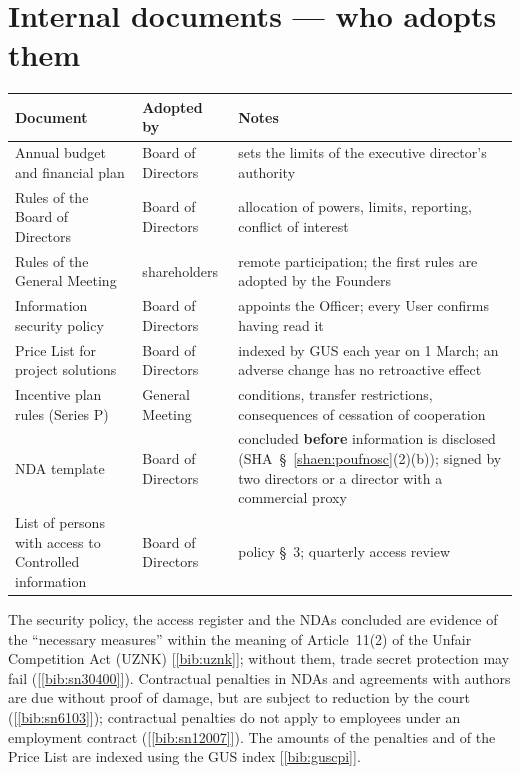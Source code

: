 \documentclass[11pt,a4paper]{report}
\newcommand{\Zr}[1]{[\ref{bib:#1}]}
\begin{document}
\section{Internal documents --- who adopts them}

\begin{tabularx}{\linewidth}{@{}>{\raggedright\arraybackslash}p{4.0cm} >{\raggedright\arraybackslash}p{3.3cm} X@{}}
\toprule
\textbf{Document} & \textbf{Adopted by} & \textbf{Notes} \\
\midrule
Annual budget and financial plan & Board of Directors & sets the limits of the executive director's authority \\
Rules of the Board of Directors & Board of Directors & allocation of powers, limits, reporting, conflict of interest \\
Rules of the General Meeting & shareholders & remote participation; the first rules are adopted by the Founders \\
Information security policy & Board of Directors & appoints the Officer; every User confirms having read it \\
Price List for project solutions & Board of Directors & indexed by GUS each year on 1 March; an adverse change has no retroactive effect \\
Incentive plan rules (Series P) & General Meeting & conditions, transfer restrictions, consequences of cessation of cooperation \\
NDA template & Board of Directors & concluded \textbf{before} information is disclosed (SHA~\S~\ref{shaen:poufnosc}(2)(b)); signed by two directors or a director with a commercial proxy \\
List of persons with access to Controlled information & Board of Directors & policy \S~3; quarterly access review \\
\bottomrule
\end{tabularx}

\begin{Komentarz}
The security policy, the access register and the NDAs concluded are evidence of the ``necessary measures'' within the meaning of Article~11(2) of the Unfair Competition Act (UZNK) \Zr{uznk}; without them, trade secret protection may fail (\Zr{sn30400}). Contractual penalties in NDAs and agreements with authors are due without proof of damage, but are subject to reduction by the court (\Zr{sn6103}); contractual penalties do not apply to employees under an employment contract (\Zr{sn12007}). The amounts of the penalties and of the Price List are indexed using the GUS index \Zr{guscpi}.
\end{Komentarz}
\end{document}

